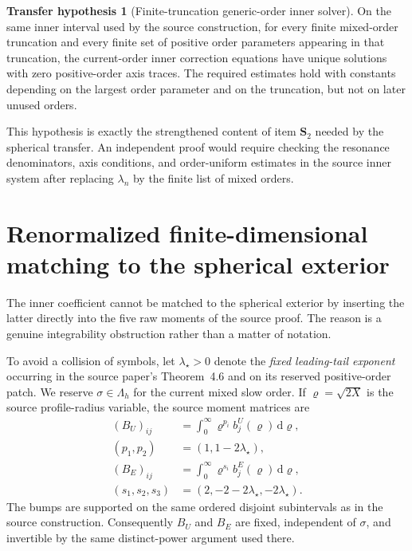 \documentclass[aps,prd,reprint,superscriptaddress,nofootinbib,floatfix]{revtex4-2}
\theoremstyle{definition}
\newtheorem{hypothesis}[theorem]{Transfer hypothesis}
\theoremstyle{remark}
\newcommand{\dd}{\mathrm{d}}
\newcommand{\Lam}{\Lambda_h}
\begin{document}
\begin{hypothesis}[Finite-truncation generic-order inner solver]\label{hyp:genericinner}
	On the same inner interval used by the source construction, for every finite mixed-order truncation and every finite set of positive order parameters appearing in that truncation, the current-order inner correction equations have unique solutions with zero positive-order axis traces.  The required estimates hold with constants depending on the largest order parameter and on the truncation, but not on later unused orders.
\end{hypothesis}

This hypothesis is exactly the strengthened content of item \(\mathbf S_2\) needed by the spherical transfer.  An independent proof would require checking the resonance denominators, axis conditions, and order-uniform estimates in the source inner system after replacing \(\lambda_n\) by the finite list of mixed orders.


\section{Renormalized finite-dimensional matching to the spherical exterior}\label{sec:matching}

The inner coefficient cannot be matched to the spherical exterior by inserting the latter directly into the five raw moments of the source proof.  The reason is a genuine integrability obstruction rather than a matter of notation.

To avoid a collision of symbols, let $\lambda_\star>0$ denote the \emph{fixed leading-tail exponent} occurring in the source paper's Theorem~4.6 and on its reserved positive-order patch.  We reserve $\sigma\in\Lam$ for the current mixed slow order.  If $\varrho=\sqrt{2X}$ is the source profile-radius variable, the source moment matrices are
\begin{align}
	(B_U)_{ij}    & =\int_0^\infty \varrho^{p_i}b^U_j(\varrho)\,\dd\varrho,
	\label{eq:BUstar}                                                       \\
	(p_1,p_2)     & =(1,1-2\lambda_\star),\nonumber                         \\
	(B_E)_{ij}    & =\int_0^\infty \varrho^{s_i}b^E_j(\varrho)\,\dd\varrho,
	\label{eq:BEstar}                                                       \\
	(s_1,s_2,s_3) & =(2,-2-2\lambda_\star,-2\lambda_\star).\nonumber
\end{align}
The bumps are supported on the same ordered disjoint subintervals as in the source construction.  Consequently $B_U$ and $B_E$ are fixed, independent of $\sigma$, and invertible by the same distinct-power argument used there.
\end{document}
